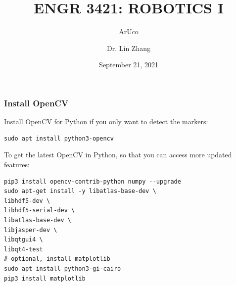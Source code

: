 \documentclass[12pt,letterpaper]{beamer}
\title[Robotics I]
{ENGR 3421: ROBOTICS I}
\subtitle{ArUco}
\author[Zhang, Lin]
{Dr. Lin Zhang}
\institute[UCA] %
{
  Department of Physics and Astronomy\\
  University of Central Arkansas
}
\date[Robotics1 2021] %
{September 21, 2021}
\begin{document}
\frame{\titlepage}



\begin{frame}[fragile]
\frametitle{Install OpenCV}

Install OpenCV for Python if you only want to detect the markers:
{\scriptsize
    \begin{verbatim}
sudo apt install python3-opencv
    \end{verbatim}
}

To get the latest OpenCV in Python, so that you can access more updated features:
{\scriptsize
    \begin{verbatim}
pip3 install opencv-contrib-python numpy --upgrade
sudo apt-get install -y libatlas-base-dev \
libhdf5-dev \
libhdf5-serial-dev \
libatlas-base-dev \
libjasper-dev \
libqtgui4 \
libqt4-test
# optional, install matplotlib
sudo apt install python3-gi-cairo
pip3 install matplotlib
    \end{verbatim}
}
\end{frame}
\end{document}
